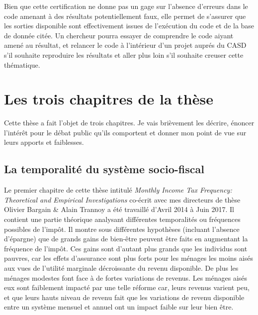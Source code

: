 Bien que cette certification ne donne pas un gage sur l'absence
d'erreurs dans le code amenant à des résultats potentiellement faux,
elle permet de s'assurer que les sorties disponible sont effectivement
issues de l'exécution du code et de la base de donnée citée. Un
chercheur pourra essayer de comprendre le code aiyant amené au résultat,
et relancer le code à l'intérieur d'un projet auprés du CASD s'il
souhaite reproduire les résultats et aller plus loin s'il souhaite
creuser cette thématique.









\section*{Les trois chapitres de la thèse}
Cette thèse a fait l'objet de trois chapitres. Je vais brièvement les décrire, énoncer l'intérêt pour le débat public qu'ils comportent et donner mon point de vue sur leurs apports et faiblesses. 


 \subsection{La temporalité du système socio-fiscal}

Le premier chapitre de cette thèse intitulé \emph{Monthly Income Tax Frequency: Theoretical and Empirical Investigations} co-écrit avec mes directeurs de thèse Olivier Bargain \& Alain Trannoy a été travaillé d'Avril 2014 à Juin 2017. Il contient une partie théorique analysant différentes temporalités ou fréquences possibles de l'impôt. Il montre sous différentes hypothèses (incluant l'absence d'épargne) que de grands gains de bien-être peuvent être faits en augmentant la fréquence de l'impôt. Ces gains sont d'autant plus grands que les individus sont pauvres, car les effets d'assurance sont plus forts pour les ménages les moins aisés aux vues de l'utilité marginale décroissante du revenu disponible. De plus les ménages modestes font face à de fortes variations de revenus. Les ménages aisés eux sont faiblement impacté par une telle réforme car, leurs revenus varient peu, et que leurs hauts niveau de revenu fait que les variations de revenu disponible entre un système mensuel et annuel ont un impact faible sur leur bien être.

